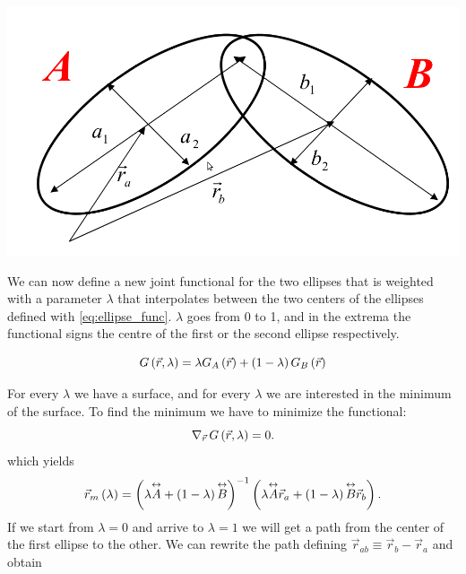 \vspace{0.1cm}
\noindent
\begin{minipage}{\textwidth}
\begin{minipage}{.85\textwidth}
  \centering
  \includegraphics[width=.85\textwidth]{pics/ellipses.jpg}
  \label{fig:ellipses}
\end{minipage}
\hfill
\begin{minipage}{.001\textwidth}
 \end{minipage}
\end{minipage}
\vspace{0.1cm}

We can now define a new joint functional for the two ellipses that is weighted with a parameter $\lambda$ that interpolates between the two centers of the ellipses defined with \eqref{eq:ellipse_func}. $\lambda$ goes from 0 to 1, and in the extrema the functional signs the centre of the first or the second ellipse respectively.

\begin{equation}
G\left(\vec{r},\lambda\right) = \lambda G_A\left(\vec{r}\right)  + \left(1-\lambda\right) G_B\left(\vec{r}\right) 
\end{equation}

For every $\lambda$ we have a surface, and for every $\lambda$ we are interested in the minimum of the surface. To find the minimum we have to minimize the functional:
\begin{equation*}
\nabla_{\vec{r}}\,G\left(\vec{r},\lambda\right) = 0.
\end{equation*}
which yields
\begin{equation}
\vec{r}_m \left(\lambda\right) = \left(\lambda \overset{\leftrightarrow}{A} + \left(1-\lambda\right) \overset{\leftrightarrow}{B}\right)^{-1} \left(\lambda\overset{\leftrightarrow}{A}\vec{r}_a + \left(1-\lambda\right)\overset{\leftrightarrow}{B}\vec{r}_b\right).
\end{equation}
If we start from $\lambda=0$ and arrive to $\lambda=1$ we will get a path from the center of the first ellipse to the other. We can rewrite the path defining $\vec{r}_{ab}\equiv \vec{r}_b-\vec{r}_a$ and obtain

